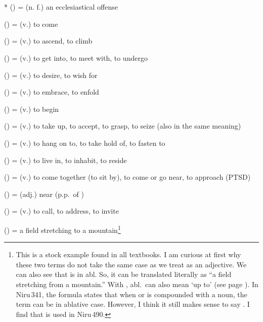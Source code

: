 \section*{}\label{upasagga:aa}
\begin{compactitem}
\item {}* () = (n. f.) an ecclesiastical offense
\item {} () = (v.) to come
\item {} () = (v.) to ascend, to climb
\item {} () = (v.) to get into, to meet with, to undergo 
\item {} () = (v.) to desire, to wish for 
\item {} () = (v.) to embrace, to enfold
\item {} () = (v.) to begin 
\item {} () = (v.) to take up, to accept, to grasp, to seize (also  in the same meaning)
\item {} () = (v.) to hang on to, to take hold of, to fasten to
\item {} () = (v.) to live in, to inhabit, to reside
\item {} () = (v.) to come together (to sit by), to come or go near, to approach (PTSD) 
\item {} () = (adj.) near (p.p.\ of )
\item {} () = (v.) to call, to address, to invite
\item {} () = a field stretching to a mountain\footnote{This is a stock example found in all textbooks. I am curious at first why these two terms do not take the same case as we treat  as an adjective. We can also see that  is in abl. So, it can be translated literally as ``a field stretching from a mountain.'' With , abl.\ can also mean `up to' (see page \pageref{par:abltill}). In Niru\,341, the formula states that when  or  is compounded with a noun, the term can be in ablative case. However, I think it still makes sense to say . I find that  is used in Niru\,490.}

\end{compactitem}
